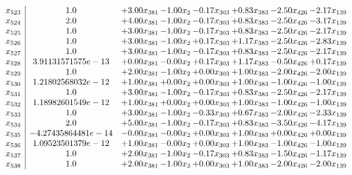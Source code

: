 \documentclass[8pt]{article}
\begin{document}
\[\begin{array}{c| c c@{\hskip 2pt} c@{\hskip 2pt} c@{\hskip 2pt} c@{\hskip 2pt} c@{\hskip 2pt} c@{\hskip 2pt} }
 x_{523}   &  1.0 & +  3.00 x_{381} & -1.00 x_{2} & -0.17 x_{303} & +  0.83 x_{383} & -2.50 x_{426} & -2.17 x_{139}\\
 x_{524}   &  2.0 & +  4.00 x_{381} & -1.00 x_{2} & -0.17 x_{303} & +  0.83 x_{383} & -2.50 x_{426} & -3.17 x_{139}\\
 x_{525}   &  1.0 & +  3.00 x_{381} & -1.00 x_{2} & -0.17 x_{303} & +  0.83 x_{383} & -2.50 x_{426} & -2.17 x_{139}\\
 x_{526}   &  1.0 & +  3.00 x_{381} & -1.00 x_{2} & +  0.17 x_{303} & +  1.17 x_{383} & -2.50 x_{426} & -2.83 x_{139}\\
 x_{527}   &  1.0 & +  3.00 x_{381} & -1.00 x_{2} & -0.17 x_{303} & +  0.83 x_{383} & -2.50 x_{426} & -2.17 x_{139}\\
 x_{528}   &  3.91131571575e-13 & +  0.00 x_{381} & -0.00 x_{2} & +  0.17 x_{303} & +  1.17 x_{383} & -0.50 x_{426} & +  0.17 x_{139}\\
 x_{529}   &  1.0 & +  2.00 x_{381} & -1.00 x_{2} & +  0.00 x_{303} & +  1.00 x_{383} & -2.00 x_{426} & -2.00 x_{139}\\
 x_{530}   &  1.21802568032e-12 & +  1.00 x_{381} & +  0.00 x_{2} & +  0.00 x_{303} & +  1.00 x_{383} & -1.00 x_{426} & -1.00 x_{139}\\
 x_{531}   &  1.0 & +  3.00 x_{381} & -1.00 x_{2} & -0.17 x_{303} & +  0.83 x_{383} & -2.50 x_{426} & -2.17 x_{139}\\
 x_{532}   &  1.18982601549e-12 & +  1.00 x_{381} & +  0.00 x_{2} & +  0.00 x_{303} & +  1.00 x_{383} & -1.00 x_{426} & -1.00 x_{139}\\
 x_{533}   &  1.0 & +  3.00 x_{381} & -1.00 x_{2} & -0.33 x_{303} & +  0.67 x_{383} & -2.00 x_{426} & -2.33 x_{139}\\
 x_{534}   &  2.0 & +  5.00 x_{381} & -1.00 x_{2} & -0.17 x_{303} & +  0.83 x_{383} & -3.50 x_{426} & -4.17 x_{139}\\
 x_{535}   &  -4.27435864481e-14 & -0.00 x_{381} & -0.00 x_{2} & +  0.00 x_{303} & +  1.00 x_{383} & +  0.00 x_{426} & +  0.00 x_{139}\\
 x_{536}   &  1.09523501379e-12 & +  1.00 x_{381} & -0.00 x_{2} & +  0.00 x_{303} & +  1.00 x_{383} & -1.00 x_{426} & -1.00 x_{139}\\
 x_{537}   &  1.0 & +  2.00 x_{381} & -1.00 x_{2} & -0.17 x_{303} & +  0.83 x_{383} & -1.50 x_{426} & -1.17 x_{139}\\
 x_{538}   &  1.0 & +  2.00 x_{381} & -1.00 x_{2} & +  0.00 x_{303} & +  1.00 x_{383} & -2.00 x_{426} & -2.00 x_{139}\\

\end{array}\]
\end{document}
